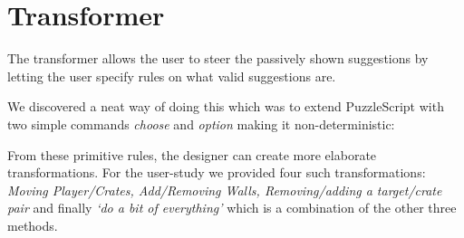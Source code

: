 \section{Transformer}
The transformer allows the user to steer the passively shown suggestions by letting the user specify rules on what valid suggestions are.

We discovered a neat way of doing this which was to extend PuzzleScript with two simple commands \textit{choose} and \textit{option} making it non-deterministic: \\
\hspace{\dimexpr-\fboxrule-\fboxsep\relax}

From these primitive rules, the designer can create more elaborate transformations. For the user-study we provided four such transformations: \textit{Moving Player/Crates, Add/Removing Walls, Removing/adding a target/crate pair} and finally \textit{`do a bit of everything'} which is a combination of the other three methods.

